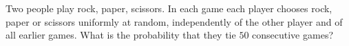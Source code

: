 Two people play rock, paper, scissors. In each game each player chooses rock, paper or scissors uniformly at random, independently of the other player and of all earlier games. What is the probability that they tie $50$ consecutive games?
